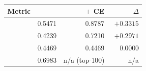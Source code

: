 \begin{tabular}{lrrr}
    \toprule
    Metric & \bmtwofive{} & \bmtwofive{} $+$ CE & $\Delta$ \\
    \midrule
    \mrr{} & 0.5471 & 0.8787 & $\mathbf{+0.3315}$ \\
    \ndcg{} & 0.4239 & 0.7210 & $\mathbf{+0.2971}$ \\
    \recallH{} & 0.4469 & 0.4469 & $\phantom{+}0.0000$ \\
    \recallK{} & 0.6983 & n/a (top-100) & n/a \\
    \bottomrule
\end{tabular}
